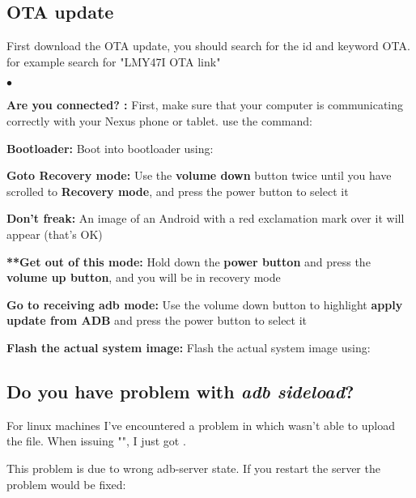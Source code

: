 \subsection{OTA update}
First download the OTA update, you should search for the id and keyword OTA. for example search for "LMY47I OTA link"
\begin{list}{$\bullet$}{}
	\item{\textbf{Are you connected? :}}\newline
		First, make sure that your computer is communicating correctly with your Nexus phone or tablet. use the command: 
	\item {\textbf{Bootloader:}} 
		Boot into bootloader using: 
	\item {\textbf{Goto Recovery mode:}} \newline
		Use the \textbf{volume down} button twice until you have scrolled to \textbf{Recovery mode}, and press the power button to select it
	\item {\textbf{Don't freak:}} 
		An image of an Android with a red exclamation mark over it will appear (that's OK)
	\item {\textbf{**Get out of this mode:}}\newline
		Hold down the \textbf{power button} and press the \textbf{volume up button}, and you will be in recovery mode
	\item {\textbf{Go to receiving adb mode:}}\newline
		Use the volume down button to highlight \textbf{apply update from ADB} and press the power button to select it
	\item {\textbf{Flash the actual system image:}} Flash the actual system image using: \newline {}
\end{list}

\subsection{Do you have problem with \textit{adb sideload}?} 
For linux machines I've encountered a problem in which  wasn't able to upload the file. When issuing "", I just got .

This problem is due to wrong adb-server state. If you restart the server the problem would be fixed:

\newline
{}\newline
{}\newline
{}

